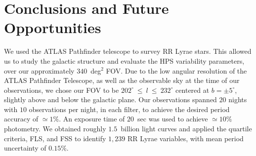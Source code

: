 \documentclass[aps,prb,twocolumn,superscriptaddress]{revtex4-1}
\begin{document}






\section{Conclusions and Future Opportunities}

We used the ATLAS Pathfinder telescope to survey RR Lyrae stars.  This allowed us to study the galactic structure and evaluate the HPS variability parameters, over our approximately $340$~deg$^2$ FOV. Due to the low angular resolution of the ATLAS Pathfinder Telescope, as well as the observable sky at the time of our observations, we chose our FOV to be $202^{\circ}~\leq~l~\leq~232^{\circ}$ centered at $b=\pm5^{\circ}$, slightly above and below the galactic plane. Our observations spanned $20$ nights with $10$ observations per night, in each filter, to achieve the desired period accuracy of $\simeq 1\%$. An exposure time of $20$~sec was used to achieve $\simeq 10\%$ photometry. We obtained roughly $1.5$~billion light curves and applied the quartile criteria, FLS, and FSS to identify $1,239$ RR Lyrae variables, with mean period uncertainty of $0.15\%$.
\end{document}
